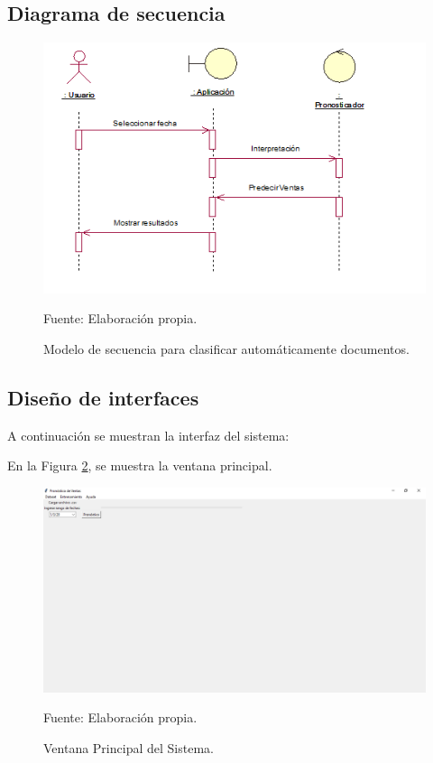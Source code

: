 \subsection{Diagrama de secuencia}
\begin{figure}[h!]
	\centering
		\includegraphics[scale=1]{imagenes/diagramasecuencia.png}
		\caption{Modelo de secuencia para clasificar automáticamente documentos.}
	\begin{center}
    Fuente: Elaboración propia.
    \end{center}
	\label{fig:dsecuencia222}
\end{figure}
\newpage


\subsection{Diseño de interfaces}
A continuación se muestran la interfaz del sistema:

En la Figura \ref{fig:InterfazAppCap3}, se muestra la ventana principal.

\begin{figure}[h!]
	\centering
		\includegraphics[scale=0.43]{imagenes/mainwindow.png}
		\caption{Ventana Principal del Sistema.}
		\begin{center}
    Fuente: Elaboración propia.
    \end{center}
	\label{fig:InterfazAppCap3}
\end{figure}

